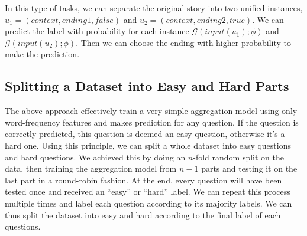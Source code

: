 In this type of tasks,
we can separate the original story into two unified instances, 
$u_1=(context, ending1, false)$ and $u_2=(context, ending2, true)$.
We can predict the label with probability for each instance $\mathcal{G}(input(u_1);\phi)$ and 
 $\mathcal{G}(input(u_2);\phi)$.
Then we can choose the ending with higher probability to make the prediction.

 
\subsection{Splitting a Dataset into Easy and Hard Parts}
The above approach effectively train a very simple aggregation model 
using only word-frequency features and makes prediction for any question.
If the question is correctly predicted, this question is deemed an easy question,
otherwise it's a hard one. Using this principle, we can split a whole
dataset into easy questions and hard questions. 
We achieved this by doing an $n$-fold random split on the
data, then training the aggregation model from $n-1$ parts and testing it on the
last part in a round-robin fashion. At the end, every question will have been
tested once and received an ``easy'' or ``hard'' label. We can repeat
this process multiple times and label each question according to its
majority labels. We can thus split the dataset into easy and hard
according to the final label of each questions.

